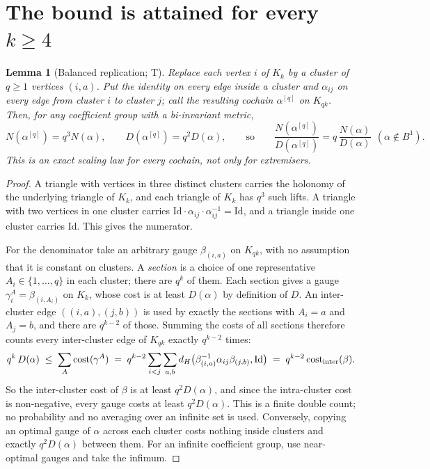 \documentclass[11pt]{article}
\newtheorem{lemma}[theorem]{Lemma}
\theoremstyle{remark}\newtheorem{remark}[theorem]{Remark}
\newcommand{\Id}{\mathrm{Id}}\newcommand{\Tr}{\operatorname{Tr}}
\begin{document}
\section{The bound is attained for every \texorpdfstring{$k\ge4$}{k>=4}}\label{sec:all}
\begin{lemma}[Balanced replication; T]\label{lem:rep}
Replace each vertex $i$ of $K_k$ by a cluster of $q\ge1$ vertices $(i,a)$. Put the identity on every edge inside a cluster and $\alpha_{ij}$ on every edge from cluster $i$ to cluster $j$; call the resulting cochain $\alpha^{[q]}$ on $K_{qk}$. Then, for any coefficient group with a bi-invariant metric,
\[
N(\alpha^{[q]})=q^3N(\alpha),\qquad D(\alpha^{[q]})=q^2D(\alpha),\qquad\text{so}\qquad \frac{N(\alpha^{[q]})}{D(\alpha^{[q]})}=q\,\frac{N(\alpha)}{D(\alpha)}\ \ (\alpha\notin B^1).
\]
This is an exact scaling law for every cochain, not only for extremisers.
\end{lemma}
\begin{proof}
A triangle with vertices in three distinct clusters carries the holonomy of the underlying triangle of $K_k$, and each triangle of $K_k$ has $q^3$ such lifts. A triangle with two vertices in one cluster carries $\Id\cdot\alpha_{ij}\cdot\alpha_{ij}^{-1}=\Id$, and a triangle inside one cluster carries $\Id$. This gives the numerator.

For the denominator take an arbitrary gauge $\beta_{(i,a)}$ on $K_{qk}$, with no assumption that it is constant on clusters. A \emph{section} is a choice of one representative $A_i\in\{1,\dots,q\}$ in each cluster; there are $q^k$ of them. Each section gives a gauge $\gamma^A_i=\beta_{(i,A_i)}$ on $K_k$, whose cost is at least $D(\alpha)$ by definition of $D$. An inter-cluster edge $((i,a),(j,b))$ is used by exactly the sections with $A_i=a$ and $A_j=b$, and there are $q^{k-2}$ of those. Summing the costs of all sections therefore counts every inter-cluster edge of $K_{qk}$ exactly $q^{k-2}$ times:
\[
q^k\,D(\alpha)\;\le\;\sum_{A}\mathrm{cost}(\gamma^A)\;=\;q^{k-2}\sum_{i<j}\sum_{a,b}\dH\big(\beta_{(i,a)}^{-1}\alpha_{ij}\beta_{(j,b)},\Id\big)\;=\;q^{k-2}\,\mathrm{cost}_{\rm inter}(\beta).
\]
So the inter-cluster cost of $\beta$ is at least $q^2D(\alpha)$, and since the intra-cluster cost is non-negative, every gauge costs at least $q^2D(\alpha)$. This is a finite double count; no probability and no averaging over an infinite set is used. Conversely, copying an optimal gauge of $\alpha$ across each cluster costs nothing inside clusters and exactly $q^2D(\alpha)$ between them. For an infinite coefficient group, use near-optimal gauges and take the infimum.
\end{proof}
\end{document}
